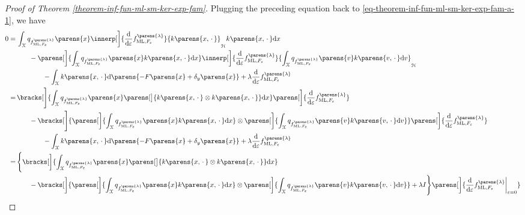 \begin{proof}[Proof of Theorem \ref{theorem-inf-fun-ml-sm-ker-exp-fam}]
	Plugging the preceding equation back to \eqref{eq-theorem-inf-fun-ml-sm-ker-exp-fam-a-1}, we have 
	\begin{align*}
		0 = & \, \int_{\calX} q_{f_{\ML, F_{\varepsilon}}^{\parens{\lambda}}} \parens{x} \innerp[\bigg]{ \frac{\diff}{\diff \varepsilon} f_{\ML, F_{\varepsilon}}^{\parens{\lambda}}}{ k \parens{x, \,\cdot\,} }_{\calH} k \parens{x, \,\cdot\,} \diff x \\ 
		& \qquad - \parens[\bigg]{\int_{\calX} q_{f_{\ML, F_{\varepsilon}}^{\parens{\lambda}}} \parens{x} k \parens{x, \,\cdot\,} \diff x} \innerp[\bigg]{ \frac{\diff}{\diff \varepsilon} f_{\ML, F_{\varepsilon}}^{\parens{\lambda}}}{ \int_{\calX} q_{f_{\ML, F_{\varepsilon}}^{\parens{\lambda}}} \parens{v} k \parens{v, \,\cdot\,} \diff v}_{\calH} \\ 
		& \qquad \qquad - \int_{\calX} k \parens{x, \,\cdot\,} \diff \parens{- F \parens{x} + \delta_y \parens{x}} + \lambda \frac{\diff}{\diff \varepsilon} f_{\ML, F_{\varepsilon}}^{\parens{\lambda}} \\ 
		= & \, \bracks[\Bigg]{\int_{\calX} q_{f_{\ML, F_{\varepsilon}}^{\parens{\lambda}}} \parens{x} \parens[\big]{k \parens{x, \,\cdot\,} \otimes k \parens{x, \,\cdot\,} } \diff x} \parens[\bigg]{\frac{\diff}{\diff \varepsilon} f_{\ML, F_{\varepsilon}}^{\parens{\lambda}} } \\ 
		& \qquad - \bracks[\Bigg]{\parens[\bigg]{\int_{\calX} q_{f_{\ML, F_{\varepsilon}}^{\parens{\lambda}}} \parens{x} k \parens{x, \,\cdot\,} \diff x} \otimes \parens[\bigg]{\int_{\calX} q_{f_{\ML, F_{\varepsilon}}^{\parens{\lambda}}} \parens{v} k \parens{v, \,\cdot\,} \diff v}} \parens[\bigg]{ \frac{\diff}{\diff \varepsilon} f_{\ML, F_{\varepsilon}}^{\parens{\lambda}}} \\ 
		& \qquad \qquad - \int_{\calX} k \parens{x, \,\cdot\,} \diff \parens{- F \parens{x} + \delta_y \parens{x}} + \lambda \frac{\diff}{\diff \varepsilon} f_{\ML, F_{\varepsilon}}^{\parens{\lambda}} \\ 
		= & \, \Bigg\{\bracks[\bigg]{\int_{\calX} q_{f_{\ML, F_{\varepsilon}}^{\parens{\lambda}}} \parens{x} \parens[\big]{k \parens{x, \,\cdot\,} \otimes k \parens{x, \,\cdot\,}} \diff x} \\ 
		& \qquad - \bracks[\bigg]{\parens[\bigg]{\int_{\calX} q_{f_{\ML, F_{\varepsilon}}^{\parens{\lambda}}} \parens{x} k \parens{x, \,\cdot\,} \diff x} \otimes \parens[\bigg]{\int_{\calX} q_{f_{\ML, F_{\varepsilon}}^{\parens{\lambda}}} \parens{v} k \parens{v, \,\cdot\,} \diff v}} + \lambda I \Bigg\} \parens[\bigg]{\frac{\diff}{\diff \varepsilon} f_{\ML, F_{\varepsilon}}^{\parens{\lambda}} \bigg\vert_{\varepsilon = 0}} \\ 

\end{align*}
\end{proof}
